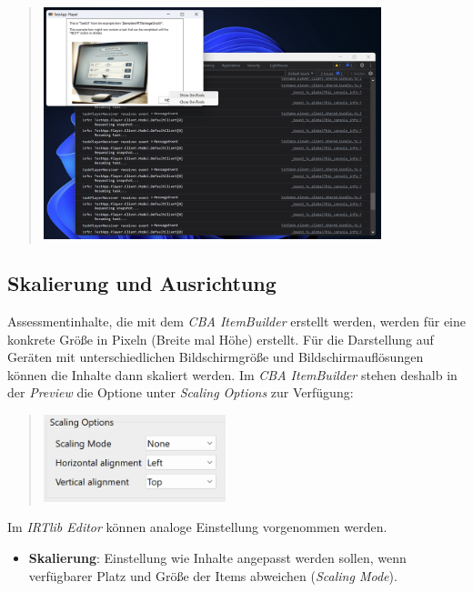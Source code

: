 \documentclass[
  letterpaper,
  DIV=11]{scrreprt}
\begin{document}
\begin{tcolorbox}
\begin{quote}
\includegraphics[width=0.8\textwidth,height=\textheight]{img/screenshot-debug-view-dev-tools-example-01.png}
\end{quote}

\hypertarget{skalierung-und-ausrichtung-1}{%
\subsection{Skalierung und
Ausrichtung}\label{skalierung-und-ausrichtung-1}}

Assessmentinhalte, die mit dem \emph{CBA ItemBuilder} erstellt werden,
werden für eine konkrete Größe in Pixeln (Breite mal Höhe) erstellt. Für
die Darstellung auf Geräten mit unterschiedlichen Bildschirmgröße und
Bildschirmauflösungen können die Inhalte dann skaliert werden. Im
\emph{CBA ItemBuilder} stehen deshalb in der \emph{Preview} die Optione
unter \emph{Scaling Options} zur Verfügung:

\begin{quote}
\includegraphics[width=2.08333in,height=\textheight]{img/screenshot-cba-itembuilder-preview-scaling-mode-01.png}
\end{quote}

Im \emph{IRTlib Editor} können analoge Einstellung vorgenommen werden.

\begin{itemize}
\item
  \textbf{Skalierung}: Einstellung wie Inhalte angepasst werden sollen,
  wenn verfügbarer Platz und Größe der Items abweichen (\emph{Scaling
  Mode}).


\end{itemize}
\end{tcolorbox}
\end{document}
